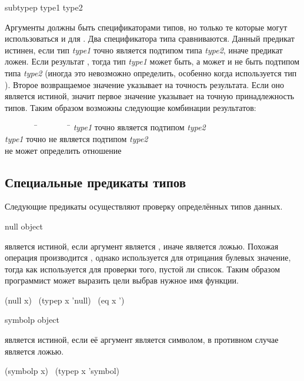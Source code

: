 \begin{defun}[Функция]
subtypep type1 type2

Аргументы должны быть спецификаторами типов, но только те которые могут
использоваться и для .
Два спецификатора типа сравниваются. Данный предикат истинен, если
тип \emph{type1} точно является подтипом типа \emph{type2}, иначе предикат ложен.
Если результат {\false}, тогда тип \emph{type1} может быть, а может и не быть
подтипом типа \emph{type2} (иногда это невозможно определить, особенно когда
используется тип ).
Второе возвращаемое значение указывает на точность результата. Если оно является
истиной, значит первое значение указывает на точную принадлежность типов. Таким
образом возможны следующие комбинации результатов:
\begin{tabbing}
~~~~~~~~\=~~~~~~~~\=\kill
{\true}\>{\true}\>\emph{type1} точно является подтипом \emph{type2} \\
{\false}\>{\true}\>\emph{type1} точно не является подтипом \emph{type2} \\
{\false}\>{\false}\> не может определить отношение
\end{tabbing}
\end{defun}

\subsection{Специальные предикаты типов}

Следующие предикаты осуществляют проверку определённых типов данных.

\begin{defun}[Функция]
null object

 является истиной, если аргумент является {\emptylist}, иначе является
ложью. Похожая операция производится , однако  используется для
отрицания булевых значение, тогда как  используется для проверки
того, пустой ли список. Таким образом программист может выразить цели выбрав
нужное имя функции.
\begin{lisp}
(null x) \EQ\ (typep x 'null) \EQ\ (eq x '{\emptylist})
\end{lisp}
\end{defun}

\begin{defun}[Функция]
symbolp object

 является истиной, если её аргумент является символом, в противном
случае является ложью.
\begin{lisp}
(symbolp x) \EQ\ (typep x 'symbol)
\end{lisp}
\end{defun}

